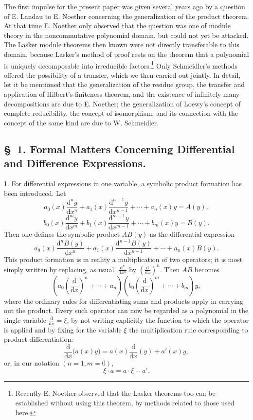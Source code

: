 \documentclass[11pt]{article}
\providecommand{\dd}{\mathrm d}
\providecommand{\dd}{\mathrm d}
\begin{document}
The first impulse for the present paper was given several years ago by a question of E. Landau to E. Noether concerning the generalization of the product theorem. At that time E. Noether only observed that the question was one of module theory in the noncommutative polynomial domain, but could not yet be attacked. The Lasker module theorems then known were not directly transferable to this domain, because Lasker's method of proof rests on the theorem that a polynomial is uniquely decomposable into irreducible factors.\footnote{Recently E. Noether observed that the Lasker theorems too can be established without using this theorem, by methods related to those used here.} Only Schmeidler's methods offered the possibility of a transfer, which we then carried out jointly. In detail, let it be mentioned that the generalization of the residue group, the transfer and application of Hilbert's finiteness theorem, and the existence of infinitely many decompositions are due to E. Noether; the generalization of Loewy's concept of complete reducibility, the concept of isomorphism, and its connection with the concept of the same kind are due to W. Schmeidler.

\subsection*{\S~1. Formal Matters Concerning Differential and Difference Expressions.}

1. For differential expressions in one variable, a symbolic product formation has been introduced. Let
\[
 a_0(x)\frac{\dd^n y}{\dd x^n}+a_1(x)\frac{\dd^{n-1}y}{\dd x^{n-1}}+\cdots+a_n(x)y=A(y),
\]
\[
 b_0(x)\frac{\dd^m y}{\dd x^m}+b_1(x)\frac{\dd^{m-1}y}{\dd x^{m-1}}+\cdots+b_m(x)y=B(y).
\]
Then one defines the symbolic product $AB(y)$ as the differential expression
\[
 a_0(x)\frac{\dd^n B(y)}{\dd x^n}+a_1(x)\frac{\dd^{n-1}B(y)}{\dd x^{n-1}}+\cdots+a_n(x)B(y).
\]
This product formation is in reality a multiplication of two operators; it is most simply written by replacing, as usual, $\frac{\dd^n}{\dd x^n}$ by $\left(\frac{\dd}{\dd x}\right)^n$. Then $AB$ becomes
\[
 \left(a_0\left(\frac{\dd}{\dd x}\right)^n+\cdots+a_n\right)
 \left(b_0\left(\frac{\dd}{\dd x}\right)^m+\cdots+b_m\right)y,
\]
where the ordinary rules for differentiating sums and products apply in carrying out the product. Every such operator can now be regarded as a polynomial in the single variable $\frac{\dd}{\dd x}=\xi$, by not writing explicitly the function to which the operator is applied and by fixing for the variable $\xi$ the multiplication rule corresponding to product differentiation:
\[
 \frac{\dd}{\dd x}\bigl(a(x)y\bigr)=a(x)\frac{\dd}{\dd x}(y)+a'(x)y,
\]
or, in our notation $(n=1,m=0)$,
\begin{equation}
 \xi\cdot a=a\cdot\xi+a'.
\tag{1}
\end{equation}
\end{document}
